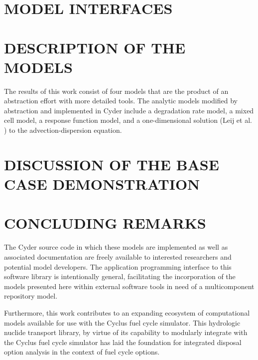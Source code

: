 \documentclass[letterpaper, 11pt]{article}
\begin{document}
\section*{MODEL INTERFACES}



\section*{DESCRIPTION OF THE MODELS}

The results of this work consist of four models that are the product of an 
abstraction effort with more detailed tools.  The analytic models modified by 
abstraction and implemented in Cyder include a degradation rate model, a mixed 
cell model, a response function model, and a one-dimensional solution (Leij et 
al. \cite{leij_analytical_1991}) to the advection-dispersion equation.










\section*{DISCUSSION OF THE BASE CASE DEMONSTRATION}


\section*{CONCLUDING REMARKS}
The Cyder source code in which these models are implemented as well as 
associated documentation are freely available to interested researchers and 
potential model developers. The application programming interface to this 
software library is intentionally general, facilitating the incorporation of the 
models presented here within external software tools in need of a multicomponent 
repository model.

Furthermore, this work contributes to an expanding ecosystem of computational 
models available for use with the Cyclus fuel cycle simulator. This hydrologic 
nuclide transport library, by virtue of its capability to modularly integrate 
with the Cyclus fuel cycle simulator has laid the foundation for integrated 
disposal option analysis in the context of fuel cycle options. 





\end{document}
